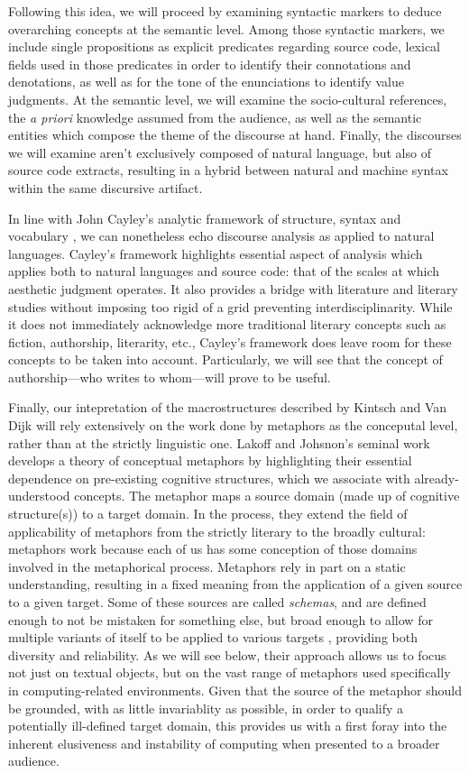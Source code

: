 Following this idea, we will proceed by examining syntactic markers to deduce overarching concepts at the semantic level. Among those syntactic markers, we include single propositions as explicit predicates regarding source code, lexical fields used in those predicates in order to identify their connotations and denotations, as well as for the tone of the enunciations to identify value judgments. At the semantic level, we will examine the socio-cultural references, the \emph{a priori} knowledge assumed from the audience, as well as the semantic entities which compose the theme of the discourse at hand. Finally, the discourses we will examine aren't exclusively composed of natural language, but also of source code extracts, resulting in a hybrid between natural and machine syntax within the same discursive artifact.

In line with John Cayley's analytic framework of structure, syntax and vocabulary \citep{cayley_code_2012}, we can nonetheless echo discourse analysis as applied to natural languages. Cayley's framework highlights essential aspect of analysis which applies both to natural languages and source code: that of the scales at which aesthetic judgment operates. It also provides a bridge with literature and literary studies without imposing too rigid of a grid preventing interdisciplinarity. While it does not immediately acknowledge more traditional literary concepts such as fiction, authorship, literarity, etc., Cayley's framework does leave room for these concepts to be taken into account. Particularly, we will see that the concept of authorship—who writes to whom—will prove to be useful.

Finally, our intepretation of the macrostructures described by Kintsch and Van Dijk will rely extensively on the work done by metaphors as the conceputal level, rather than at the strictly linguistic one. Lakoff and Johsnon's seminal work develops a theory of conceptual metaphors by highlighting their essential dependence on pre-existing cognitive structures, which we associate with already-understood concepts. The metaphor maps a source domain (made up of cognitive structure(s)) to a target domain. In the process, they extend the field of applicability of metaphors from the strictly literary to the broadly cultural: metaphors work because each of us has some conception of those domains involved in the metaphorical process. Metaphors rely in part on a static understanding, resulting in a fixed meaning from the application of a given source to a given target. Some of these sources are called \emph{schemas}, and are defined enough to not be mistaken for something else, but broad enough to allow for multiple variants of itself to be applied to various targets \citep{lakoff_metaphors_1980}, providing both diversity and reliability. As we will see below, their approach allows us to focus not just on textual objects, but on the vast range of metaphors used specifically in computing-related environments. Given that the source of the metaphor should be grounded, with as little invariablity as possible, in order to qualify a potentially ill-defined target domain, this provides us with a first foray into the inherent elusiveness and instability of computing when presented to a broader audience.

